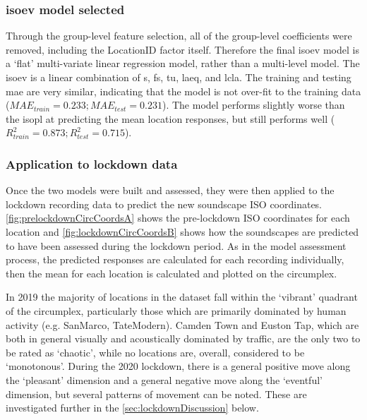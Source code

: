    \subsubsection{\gls{isoev} model selected}

   Through the group-level feature selection, all of the group-level coefficients were removed, including the LocationID factor itself. Therefore the final \gls{isoev} model is a `flat' multi-variate linear regression model, rather than a multi-level model. The \gls{isoev} is a linear combination of \gls{s}, \gls{fs}, \gls{tu}, \gls{laeq}, and \gls{lcla}. The training and testing \gls{mae} are very similar, indicating that the model is not over-fit to the training data ($MAE_{train}=0.233; MAE_{test}=0.231$). The model performs slightly worse than the \gls{isopl} at predicting the mean location responses, but still performs well ($R^2_{train}=0.873; R^2_{test}=0.715$).

   \subsubsection{Application to lockdown data}
   \label{sec:applicationLockdown}
   Once the two models were built and assessed, they were then applied to the lockdown recording data to predict the new soundscape ISO coordinates. \cref{fig:prelockdownCircCoordsA} shows the pre-lockdown ISO coordinates for each location and \cref{fig:lockdownCircCoordsB} shows how the soundscapes are predicted to have been assessed during the lockdown period. As in the model assessment process, the predicted responses are calculated for each recording individually, then the mean for each location is calculated and plotted on the circumplex.

   In 2019 the majority of locations in the dataset fall within the `vibrant' quadrant of the circumplex, particularly those which are primarily dominated by human activity (e.g. SanMarco, TateModern). Camden Town and Euston Tap, which are both in general visually and acoustically dominated by traffic, are the only two to be rated as `chaotic', while no locations are, overall, considered to be `monotonous'. During the 2020 lockdown, there is a general positive move along the `pleasant' dimension and a general negative move along the `eventful' dimension, but several patterns of movement can be noted. These are investigated further in the \cref{sec:lockdownDiscussion} below.


